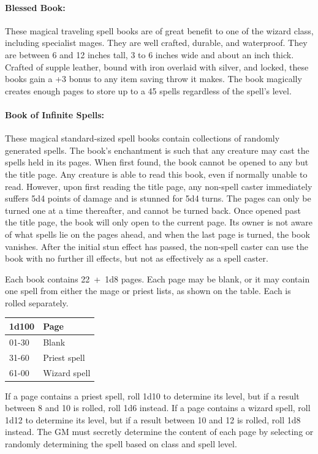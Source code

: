 \begin{multicols}{2}
\paragraph{Blessed Book:} These magical traveling spell books are of great benefit to one of the wizard class, including specialist mages.  They are well crafted, durable, and waterproof.  They are between 6 and 12 inches tall, 3 to 6 inches wide and about an inch thick.  Crafted of supple leather, bound with iron overlaid with silver, and locked, these books gain a +3 bonus to any item saving throw it makes.  The book magically creates enough pages to store up to a 45 spells regardless of the spell's level.

\paragraph{Book of Infinite Spells:} These magical standard-sized spell books contain collections of randomly generated spells.  The book's enchantment is such that any creature may cast the spells held in its pages.  When first found, the book cannot be opened to any but the title page.  Any creature is able to read this book, even if normally unable to read.  However, upon first reading the title page, any non-spell caster immediately suffers 5d4 points of damage and is stunned for 5d4 turns.  The pages can only be turned one at a time thereafter, and cannot be turned back.  Once opened past the title page, the book will only open to the current page.  Its owner is not aware of what spells lie on the pages ahead, and when the last page is turned, the book vanishes.  After the initial stun effect has passed, the non-spell caster can use the book with no further ill effects, but not as effectively as a spell caster.

Each book contains 22~+~1d8 pages.  Each page may be blank, or it may contain one spell from either the mage or priest lists, as shown on the table.  Each is rolled separately.

\noindent
\begin{tabular}{|p{}|p{}|}
\hline
1d100	& Page \\
\hline\hline
\rowcolor[gray]{.9}01-30	& Blank \\
31-60	& Priest spell \\
\rowcolor[gray]{.9}61-00	& Wizard spell \\
\hline
\end{tabular}

If a page contains a priest spell, roll 1d10 to determine its level, but if a result between 8 and 10 is rolled, roll 1d6 instead.  If a page contains a wizard spell, roll 1d12 to determine its level, but if a result between 10 and 12 is rolled, roll 1d8 instead.  The GM must secretly determine the content of each page by selecting or randomly determining the spell based on class and spell level.


\end{multicols}
